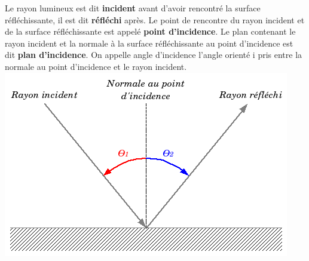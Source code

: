 \documentclass[a4paper,11pt]{article}
\begin{document}
\begin{defi}
Le rayon lumineux est dit \textbf{incident} avant d'avoir rencontré la surface réfléchissante, il est dit \textbf{réfléchi} après. Le point de rencontre du rayon incident et de la surface     réfléchissante est appelé \textbf{point d'incidence}. Le plan contenant le rayon incident et la normale à la surface réfléchissante au point d'incidence est dit \textbf{plan d'incidence}.
On appelle angle d'incidence l'angle orienté i pris entre la normale au point d'incidence et le rayon incident. 
\\\includegraphics[scale=0.5]{Reflexion_fr.png} \centering
\end{defi}
\end{document}
